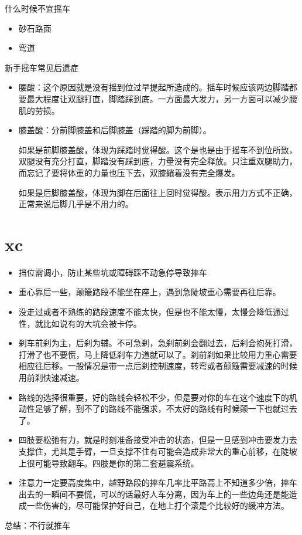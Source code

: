 \documentclass{ctexbook}
\begin{document}
什么时候不宜摇车
\begin{itemize}
\item 砂石路面
\item 弯道
\end{itemize}
新手摇车常见后遗症
\begin{itemize}
\item 腰酸：这个原因就是没有摇到位过早提起所造成的。摇车时候应该两边脚踏都要最大程度让双腿打直，脚踏踩到底。一方面最大发力，另一方面可以减少腰肌的劳损。
\item 膝盖酸：分前脚膝盖和后脚膝盖（踩踏的脚为前脚）。

如果是前脚膝盖酸，体现为踩踏时觉得酸。这个是也是由于摇车不到位所致，双腿没有充分打直，脚踏没有踩到底，力量没有完全释放。只注重双腿助力，而忘记了要将体重的力量也压下去，双膝蜷着没有完全爆发。

如果是后脚膝盖酸，体现为脚在后面往上回时觉得酸。表示用力方式不正确，正常来说后脚几乎是不用力的。
\end{itemize}
\section{xc}
\begin{itemize}
\item 挡位需调小，防止某些坑或障碍踩不动急停导致摔车

\item 重心靠后一些，颠簸路段不能坐在座上，遇到急陡坡重心需要再往后靠。

\item 没走过或者不熟练的路段速度不能太快，但是也不能太慢，太慢会降低通过性，就比如说有的大坑会被卡停。

\item 刹车前刹为主，后刹为辅。不可急刹，急刹前刹会翻过去，后刹会抱死打滑，打滑了也不要慌，马上降低刹车力道就可以了。刹前刹如果比较用力重心需要相应往后移。一般情况是带一点后刹控制速度，转弯或者颠簸需要减速的时候用前刹快速减速。

\item 路线的选择很重要，好的路线会轻松不少，但是要对你的车在这个速度下的机动性足够了解，到不了的路线不能强求，不太好的路线有时候颠一下也就过去了。

\item 四肢要松弛有力，就是时刻准备接受冲击的状态，但是一旦感到冲击要发力去支撑住，尤其是手臂，一旦支撑不住有可能会造成非常大的重心前移，在陡坡上很可能导致翻车。四肢是你的第二套避震系统。

\item 注意力一定要高度集中，越野路段的摔车几率比平路高上不知道多少倍，摔车出去的一瞬间不要慌，可以的话最好人车分离，因为车上的一些边角还是能造成一些伤害的，尽可能保护好自己，在地上打个滚是个比较好的缓冲方法。
\end{itemize}
总结：不行就推车
\end{document}
